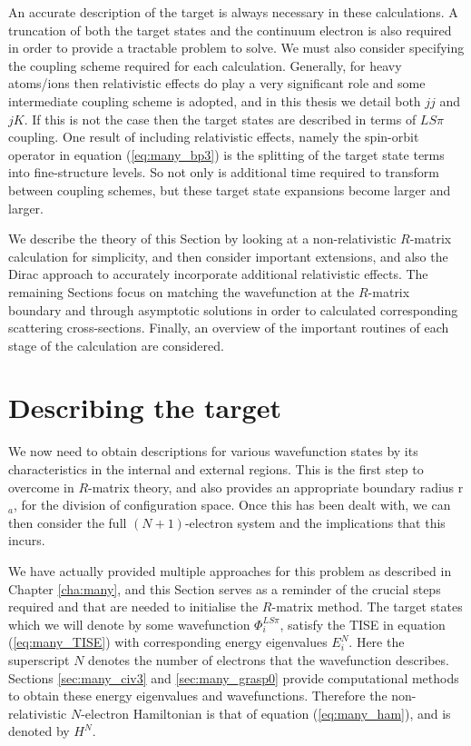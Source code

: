 An accurate description of the target is always necessary in these calculations. A truncation of both the target states and the continuum electron is also required in order to provide a tractable problem to solve. We must also consider specifying the coupling scheme required for each calculation. Generally, for heavy atoms/ions then relativistic effects do play a very significant role and some intermediate coupling scheme is adopted, and in this thesis we detail both $jj$ and $jK$. If this is not the case then the target states are described in terms of $LS\pi$ coupling. One result of including relativistic effects, namely the spin-orbit operator in equation (\ref{eq:many_bp3}) is the splitting of the target state terms into fine-structure levels. So not only is additional time required to transform between coupling schemes, but these target state expansions become larger and larger.

We describe the theory of this Section by looking at a non-relativistic $R$-matrix calculation for simplicity, and then consider important extensions, and also the Dirac approach to accurately incorporate additional relativistic effects. The remaining Sections focus on matching the wavefunction at the $R$-matrix boundary and through asymptotic solutions in order to calculated corresponding scattering cross-sections. Finally, an overview of the important routines of each stage of the calculation are considered.

\section{Describing the target}\label{sec:target}
We now need to obtain descriptions for various wavefunction states by its characteristics in the internal and external regions. This is the first step to overcome in $R$-matrix theory, and also provides an appropriate boundary radius r$_a$, for the division of configuration space. Once this has been dealt with, we can then consider the full $(N+1)$-electron system and the implications that this incurs.

We have actually provided multiple approaches for this problem as described in Chapter \ref{cha:many}, and this Section serves as a reminder of the crucial steps required and that are needed to initialise the $R$-matrix method. The target states which we will denote by some wavefunction $\Phi^{LS\pi}_i$, satisfy the TISE in equation (\ref{eq:many_TISE}) with corresponding energy eigenvalues $E_i^N$. Here the superscript $N$ denotes the number of electrons that the wavefunction describes. Sections \ref{sec:many_civ3} and \ref{sec:many_grasp0} provide computational methods to obtain these energy eigenvalues and wavefunctions. Therefore the non-relativistic $N$-electron Hamiltonian is that of equation (\ref{eq:many_ham}), and is denoted by $H^N$.

